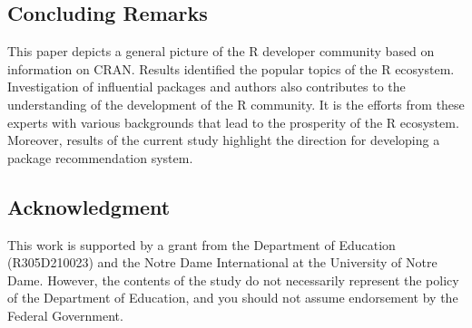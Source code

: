 \subsection{Concluding Remarks}

This paper depicts a general picture of the R developer community based on information on CRAN. Results identified the popular topics of the R ecosystem. Investigation of influential packages and authors also contributes to the understanding of the development of the R community. It is the efforts from these experts with various backgrounds that lead to the prosperity of the R ecosystem. Moreover, results of the current study highlight the direction for developing a package recommendation system.


\subsection{Acknowledgment}

This work is supported by a grant from the Department of Education (R305D210023) and the Notre Dame International at the University of Notre Dame. However, the contents of the study do not necessarily represent the policy of the Department of Education, and you should not assume endorsement by the Federal Government.

\appendix

